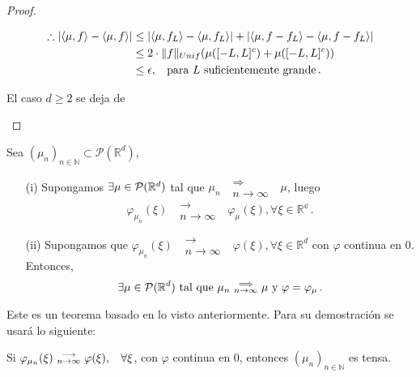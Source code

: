 \begin{proof}
\begin{itemize}
\begin{itemize}
        \begin{alignat*}{2}
        \therefore |\langle \mu,f\rangle-\langle\mu,f\rangle| & \leq |\langle \mu,f_L\rangle-\langle\mu,f_L\rangle| + |\langle \mu,f-f_L\rangle-\langle\mu,f-f_L\rangle| \\
         & \leq 2\cdot \|f\|_{Unif}(\mu([-L,L]^c)+\mu([-L,L]^c)) \\
         & \leq \epsilon , \hspace{.25cm}\, \mbox{para }L\mbox{ suficientemente grande} \, .
        \end{alignat*}
    \end{itemize}
    El caso $d\geq 2$ se deja de \ejercicio
\end{itemize}
\findem
\negro
\end{proof}

\begin{theorem}[Lévy]
\label{theorem:levy}
Sea $(\mu_n)_{n\in\mathbb{N}}\subset\mathcal{P}(\mathbb{R}^d)$,
\begin{enumerate}
    \item[(i)] Supongamos $\exists \mu\in\mathcal{P}(\mathbb{R}^d)$ tal que $\mu_n\mbox{ }\substack{\Longrightarrow \\ n\to\infty}\mbox{ }\mu$, luego 
    $$ \varphi_{\mu_n}(\xi)\mbox{ }\substack{\longrightarrow \\ n\to\infty}\mbox{ }\varphi_\mu(\xi), \forall\xi\in\mathbb{R^d} \, .$$
    \item[(ii)] Supongamos que $\varphi_{\mu_n}(\xi)\mbox{ }\substack{\longrightarrow \\ n\to\infty}\mbox{ }\varphi(\xi), \forall\xi\in\mathbb{R}^d$ con $\varphi$ continua en $0$. Entonces, $$\exists\mu\in\mathcal{P}(\mathbb{R}^d)\mbox{ tal que }\mu_n\mbox{ }\substack{\Longrightarrow \\ n\to\infty}\mbox{ }\mu\mbox{ y }\varphi=\varphi_\mu \, .$$
\end{enumerate}
\end{theorem}
Este es un teorema basado en lo visto anteriormente. Para su demostración se usará lo siguiente:
\begin{lemma}
\label{lemma:levy}
Si $\varphi_{\mu_n}(\xi)\mbox{ }\substack{\longrightarrow \\ n\to\infty}\mbox{ }\varphi(\xi), \hspace{.25cm}\, \forall \xi$, con $\varphi$ continua en $0$, entonces $(\mu_n)_{n\in\mathbb{N}}$ es tensa.
\end{lemma}
